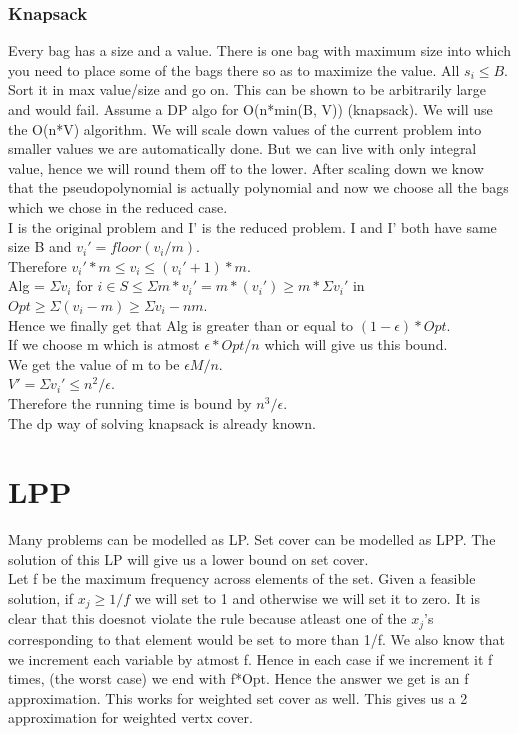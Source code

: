 \documentclass[solution,addpoints,12pt]{exam}
\begin{document}
\subsubsection{Knapsack}
Every bag has a size and a value. There is one bag
with maximum size into which you need to place
some of the bags there so as to maximize the value.
All $s_i \le B$. Sort it in max value/size and go
on. This can be shown to be arbitrarily large and would
fail. Assume a DP algo for O(n*min(B, V)) (knapsack).
We will use the O(n*V) algorithm.
We will scale down values of the current problem
into smaller values we are automatically done. But
we can live with only integral value, hence we
will round them off to the lower. After scaling down
we know that the pseudopolynomial is actually polynomial
and now we choose all the bags which we chose in the reduced
case.\\
I is the original problem and I' is the reduced problem.
I and I' both have same size B and $v_i' = floor(v_i/m)$.\\
Therefore $v_i'*m \le v_i \le (v_i'+1)*m$.\\
Alg = $\Sigma v_i$ for $i \in S \le \Sigma m*v_i' = m*(v_i')
\ge m*\Sigma v_i'$ in $Opt \ge \Sigma (v_i - m) \ge \Sigma v_i
- nm$.\\
Hence we finally get that Alg is greater than or equal to
$(1 - \epsilon)*Opt$.\\
If we choose m which is atmost $\epsilon*Opt/n$ which will give us
this bound.\\
We get the value of m to be $\epsilon M/n$.\\
$V' = \Sigma v_i' \le n^2/\epsilon$.\\
Therefore the running time is bound by $n^3/\epsilon$.\\
The dp way of solving knapsack is already known.\\

\section{LPP}
Many problems can be modelled as LP.
Set cover can be modelled as LPP.
The solution of this LP will give us a lower bound
on set cover.\\

Let f be the maximum frequency across elements of the set.
Given a feasible solution, if $x_j \ge 1/f$ we will
set to 1 and otherwise we will set it to zero. It is
clear that this doesnot violate the rule because atleast one
of the $x_j$'s corresponding to that element would be set to
more than 1/f. We also know that we increment each variable by atmost f.
Hence in each case if we increment it f times, (the worst case)
we end with f*Opt. Hence the answer we get is an f approximation.
This works for weighted set cover as well. This gives us a 2 approximation
for weighted vertx cover.\\
\end{document}
